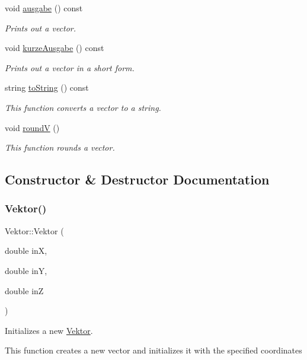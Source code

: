 \begin{DoxyCompactItemize}
void \hyperlink{class_vektor_aa3c41759f0a472327a8970878234675a}{ausgabe} () const
\begin{DoxyCompactList}\small\item\em Prints out a vector. \end{DoxyCompactList}\item 
void \hyperlink{class_vektor_aa564a92eff73be949827eebef9806652}{kurze\+Ausgabe} () const
\begin{DoxyCompactList}\small\item\em Prints out a vector in a short form. \end{DoxyCompactList}\item 
string \hyperlink{class_vektor_abcc349a76c74b8464efaedddfec94a04}{to\+String} () const
\begin{DoxyCompactList}\small\item\em This function converts a vector to a string. \end{DoxyCompactList}\item 
void \hyperlink{class_vektor_af419bc72996d543d73ceb0c476075f8a}{roundV} ()
\begin{DoxyCompactList}\small\item\em This function rounds a vector. \end{DoxyCompactList}\end{DoxyCompactItemize}


\subsection{Constructor \& Destructor Documentation}
\mbox{\label{class_vektor_a744b4980d331af082c08890ff2e4a857}} 
\subsubsection{\texorpdfstring{Vektor()}{Vektor()}}
{\footnotesize\ttfamily Vektor\+::\+Vektor (\begin{DoxyParamCaption}\item[{double}]{inX,  }\item[{double}]{inY,  }\item[{double}]{inZ }\end{DoxyParamCaption})}



Initializes a new \hyperlink{class_vektor}{Vektor}. 

This function creates a new vector and initializes it with the specified coordinates


